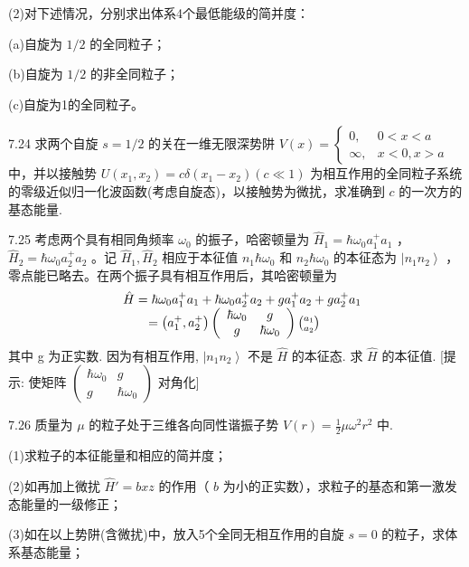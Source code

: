 (2)对下述情况，分别求出体系4个最低能级的简并度：

(a)自旋为 $1/2$ 的全同粒子；

(b)自旋为 $1/2$ 的非全同粒子；

(c)自旋为1的全同粒子。

\vfill\newpage

7.24 求两个自旋 $s = 1 / 2$ 的关在一维无限深势阱 $V(x) = \left\{ \begin{array}{ll}0, & 0 < x < a\\ \infty , & x < 0,x > a \end{array} \right.$ 中，并以接触势 $U(x_{1},x_{2}) = c\delta (x_{1} - x_{2})(c\ll 1)$ 为相互作用的全同粒子系统的零级近似归一化波函数(考虑自旋态)，以接触势为微扰，求准确到 $c$ 的一次方的基态能量.

\vfill\newpage

7.25 考虑两个具有相同角频率 $\omega_0$ 的振子，哈密顿量为 $\hat{H}_1 = \hbar \omega_0 a_1^+ a_1$ ， $\hat{H}_2 = \hbar \omega_0 a_2^+ a_2$ 。记 $\hat{H}_1, \hat{H}_2$ 相应于本征值 $n_1 \hbar \omega_0$ 和 $n_2 \hbar \omega_0$ 的本征态为 $\left| n_1 n_2 \right\rangle$ ，零点能已略去。在两个振子具有相互作用后，其哈密顿量为
$$
\begin{array}{r l} & {\hat {H} = \hbar \omega_ {0} a _ {1} ^ {+} a _ {1} + \hbar \omega_ {0} a _ {2} ^ {+} a _ {2} + g a _ {1} ^ {+} a _ {2} + g a _ {2} ^ {+} a _ {1}} \\ & {\qquad = \left(a _ {1} ^ {+}, a _ {2} ^ {+}\right) \left( \begin{array}{c c} {\hbar \omega_ {0}} & {g} \\ {g} & {\hbar \omega_ {0}} \end{array} \right) \binom {a _ {1}} {a _ {2}}} \end{array}
$$
其中 g 为正实数. 因为有相互作用, $\left|n_{1}n_{2}\right\rangle$ 不是 $\hat{H}$ 的本征态. 求 $\hat{H}$ 的本征值. [提示: 使矩阵 $\begin{pmatrix}\hbar\omega_{0}&g\\g&\hbar\omega_{0}\end{pmatrix}$ 对角化]

\vfill\newpage

7.26 质量为 $\mu$ 的粒子处于三维各向同性谐振子势 $V(r) = \frac{1}{2}\mu \omega^2 r^2$ 中.

(1)求粒子的本征能量和相应的简并度；

(2)如再加上微扰 $\hat{H}' = bxz$ 的作用（ $b$ 为小的正实数），求粒子的基态和第一激发态能量的一级修正；

(3)如在以上势阱(含微扰)中，放入5个全同无相互作用的自旋 $s = 0$ 的粒子，求体系基态能量；

